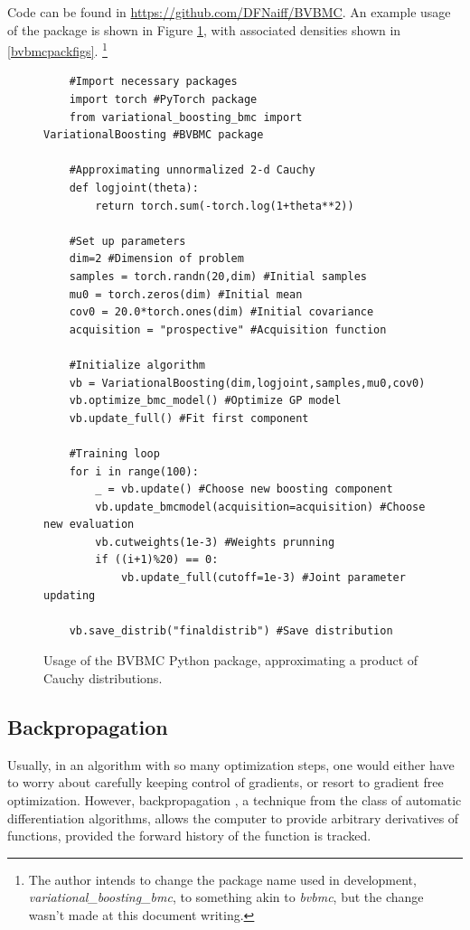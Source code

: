 Code can be found in \url{https://github.com/DFNaiff/BVBMC}. An example usage of the package is shown in Figure \ref{bvbmcpackexample}, with associated densities shown in \ref{bvbmcpackfigs}. \footnote{The author intends to change the package name used in development, \textit{variational\_boosting\_bmc}, to something akin to \textit{bvbmc}, but the change wasn't made at this document writing.}

\begin{figure}\label{bvbmcpackexample}
	\begin{lstlisting}
	#Import necessary packages
	import torch #PyTorch package
	from variational_boosting_bmc import VariationalBoosting #BVBMC package
	
	#Approximating unnormalized 2-d Cauchy
	def logjoint(theta):
		return torch.sum(-torch.log(1+theta**2))
	
	#Set up parameters
	dim=2 #Dimension of problem
	samples = torch.randn(20,dim) #Initial samples
	mu0 = torch.zeros(dim) #Initial mean
	cov0 = 20.0*torch.ones(dim) #Initial covariance
	acquisition = "prospective" #Acquisition function
	
	#Initialize algorithm
	vb = VariationalBoosting(dim,logjoint,samples,mu0,cov0)
	vb.optimize_bmc_model() #Optimize GP model
	vb.update_full() #Fit first component
	
	#Training loop
	for i in range(100):
		_ = vb.update() #Choose new boosting component
		vb.update_bmcmodel(acquisition=acquisition) #Choose new evaluation
		vb.cutweights(1e-3) #Weights prunning
		if ((i+1)%20) == 0:
			vb.update_full(cutoff=1e-3) #Joint parameter updating
	
	vb.save_distrib("finaldistrib") #Save distribution
	\end{lstlisting}
	\caption[Usage of the BVBMC Python package.]{\label{bvbmcpackexample}Usage of the BVBMC Python package, approximating a product of Cauchy distributions.}
\end{figure}

\subsection{Backpropagation}
Usually, in an algorithm with so many optimization steps, one would either have to worry about carefully keeping control of gradients, or resort to gradient free optimization. However, backpropagation \cite{Goodfellow_2016}, a technique from the class of automatic differentiation algorithms, allows the computer to provide arbitrary derivatives of functions, provided the forward history of the function is tracked.

